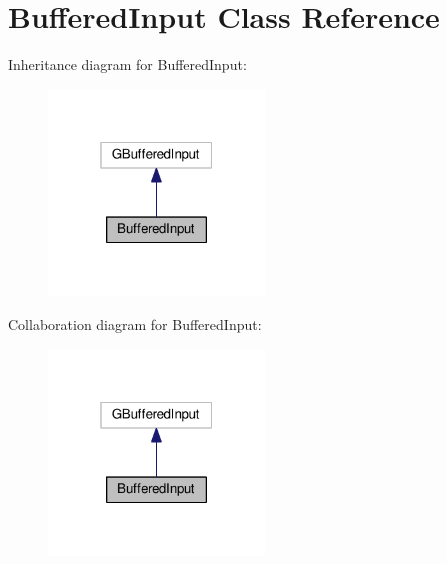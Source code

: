 \hypertarget{classBufferedInput}{}\section{Buffered\+Input Class Reference}
\label{classBufferedInput}


Inheritance diagram for Buffered\+Input\+:
\nopagebreak
\begin{figure}[H]
\begin{center}
\leavevmode
\includegraphics[width=163pt]{classBufferedInput__inherit__graph}
\end{center}
\end{figure}


Collaboration diagram for Buffered\+Input\+:
\nopagebreak
\begin{figure}[H]
\begin{center}
\leavevmode
\includegraphics[width=163pt]{classBufferedInput__coll__graph}
\end{center}
\end{figure}
